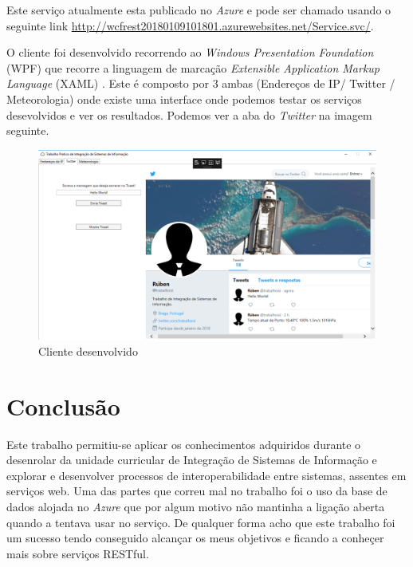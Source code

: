 \documentclass[11pt]{report}
\begin{document}
Este serviço atualmente esta publicado no \textit{Azure} e pode ser chamado usando o seguinte link \url{http://wcfrest20180109101801.azurewebsites.net/Service.svc/}.

\clearpage

O cliente foi  desenvolvido recorrendo ao \textit{Windows Presentation Foundation} (WPF) que recorre a linguagem de marcação \textit{Extensible Application Markup Language} (XAML) . Este é composto por 3 ambas (Endereços de IP/ Twitter / Meteorologia) onde existe uma interface onde podemos testar os serviços desevolvidos e ver os resultados. Podemos ver a aba do \textit{Twitter} na imagem seguinte.

\begin{figure} [!h]
\centering
\includegraphics[width=\textwidth]{Prints_Trabalho/cliente.png}
\caption{Cliente desenvolvido}
\label{Rotulo}
\end{figure}


\chapter*{Conclusão}

Este trabalho permitiu-se aplicar os conhecimentos adquiridos durante o desenrolar da unidade curricular de Integração de Sistemas de Informação e explorar e desenvolver processos de interoperabilidade entre sistemas, assentes em serviços web. Uma das partes que correu mal no trabalho foi o uso da base de dados alojada no \textit{Azure} que por algum motivo não mantinha a ligação aberta quando a tentava usar no serviço. De qualquer forma acho que este trabalho foi um sucesso tendo conseguido alcançar os meus objetivos e ficando a conheçer mais sobre serviços RESTful.
\end{document}
